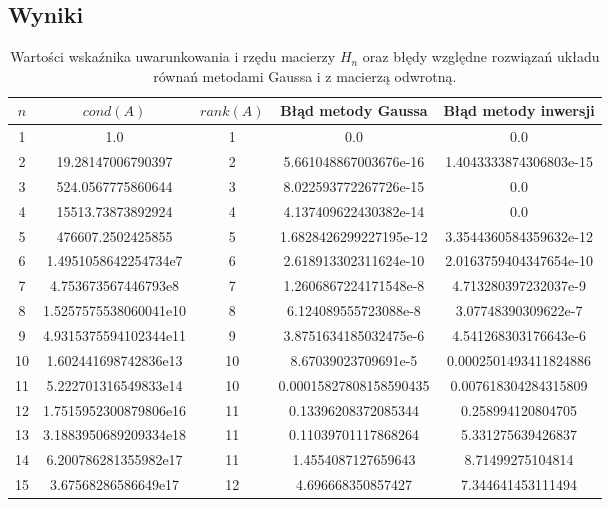 \documentclass{article}
\begin{document}
\subsection{Wyniki}
\begin{table}[H]
\begin{adjustbox}{center}
\begin{tabular}{|c|c|c|c|c|}
    \hline
    $n$ & $cond(A)$ & $rank(A)$ & Błąd metody Gaussa & Błąd metody inwersji\\
    \hline
    1 & 1.0 & 1 & 0.0 & 0.0\\
    \hline
    2 & 19.28147006790397 & 2 & 5.661048867003676e-16 & 1.4043333874306803e-15\\
    \hline
    3 & 524.0567775860644 & 3 & 8.022593772267726e-15 & 0.0\\
    \hline
    4 & 15513.73873892924 & 4 & 4.137409622430382e-14 & 0.0\\
    \hline
    5 & 476607.2502425855 & 5 & 1.6828426299227195e-12 & 3.3544360584359632e-12\\
    \hline
    6 & 1.4951058642254734e7 & 6 & 2.618913302311624e-10 & 2.0163759404347654e-10\\
    \hline
    7 & 4.753673567446793e8 & 7 & 1.2606867224171548e-8 & 4.713280397232037e-9\\
    \hline
    8 & 1.5257575538060041e10 & 8 & 6.124089555723088e-8 & 3.07748390309622e-7\\
    \hline
    9 & 4.9315375594102344e11 & 9 & 3.8751634185032475e-6 & 4.541268303176643e-6\\
    \hline
    10 & 1.602441698742836e13 & 10 & 8.67039023709691e-5 & 0.0002501493411824886\\
    \hline
    11 & 5.222701316549833e14 & 10 & 0.00015827808158590435 & 0.007618304284315809\\
    \hline
    12 & 1.7515952300879806e16 & 11 & 0.13396208372085344 & 0.258994120804705\\
    \hline
    13 & 3.1883950689209334e18 & 11 & 0.11039701117868264 & 5.331275639426837\\
    \hline
    14 & 6.200786281355982e17 & 11 & 1.4554087127659643 & 8.71499275104814\\
    \hline
    15 & 3.67568286586649e17 & 12 & 4.696668350857427 & 7.344641453111494\\
    \hline
\end{tabular}
\end{adjustbox}
\caption{Wartości wskaźnika uwarunkowania i rzędu macierzy {$H_n$} oraz błędy względne rozwiązań układu równań metodami Gaussa i z macierzą odwrotną.}
\end{table}
\end{document}
